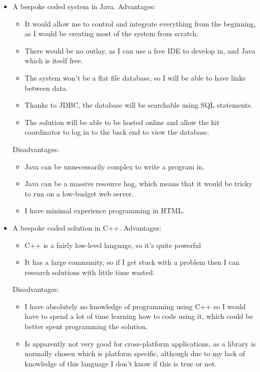 \documentclass[
11pt, %
a4paper, %
oneside, %
headinclude,footinclude, %
BCOR5mm, %
]{scrartcl}
\begin{document}
\begin{itemize}
\begin{itemize}
		\end{itemize}
	\item A bespoke coded system in Java. Advantages:\begin{itemize}
		\item It would allow me to control and integrate everything from the beginning, as I would be creating most of the system from scratch.
		\item There would be no outlay, as I can use a free IDE to develop in, and Java which is itself free.
		\item The system won't be a flat file database, so I will be able to have links between data.
		\item Thanks to JDBC, the database will be searchable using SQL statements.
		\item The solution will be able to be hosted online and allow the kit coordinator to log in to the back end to view the database.
	\end{itemize}
	Disadvantages:\begin{itemize}
		\item Java can be unnecessarily complex to write a program in.
		\item Java can be a massive resource hog, which means that it would be tricky to run on a low-budget web server.
		\item I have minimal experience programming in HTML.
	\end{itemize}
	\item A bespoke coded solution in C++. Advantages:\begin{itemize}
		\item C++ is a fairly low-level language, so it's quite powerful
		\item It has a large community, so if I get stuck with a problem then I can research solutions with little time wasted.
	\end{itemize}
	Disadvantages:\begin{itemize}
		\item I have absolutely no knowledge of programming using C++ so I would have to spend a lot of time learning how to code using it, which could be better spent programming the solution. 
		\item Is apparently not very good for cross-platform applications, as a library is normally chosen which is platform specific, although due to my lack of knowledge of this language I don't know if this is true or not.
	\end{itemize}
\end{itemize}
\end{document}
